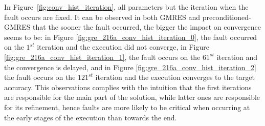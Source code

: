 In Figure~\ref{fig:conv_hist_iteration}, all parameters but the iteration when the fault occurs are fixed. It can be observed in both GMRES and preconditioned-GMRES that the sooner the fault occurred, the bigger the impact on convergence seems to be: in Figure \ref{fig:gre_216a_conv_hist_iteration_0}, the fault occurred on the $1^{st}$ iteration and the execution did not converge, in Figure \ref{fig:gre_216a_conv_hist_iteration_1}, the fault occurs on the $61^{st}$ iteration and the convergence is delayed, and in Figure \ref{fig:gre_216a_conv_hist_iteration_2} the fault occurs on the $121^{st}$ iteration and the execution converges to the target accuracy.
This observations complies with the intuition that the first iterations are responsible for the main part of the solution, while latter ones are responsible for its refinement, hence faults are more likely to be critical when occurring at the early stages of the execution than towards the end.





